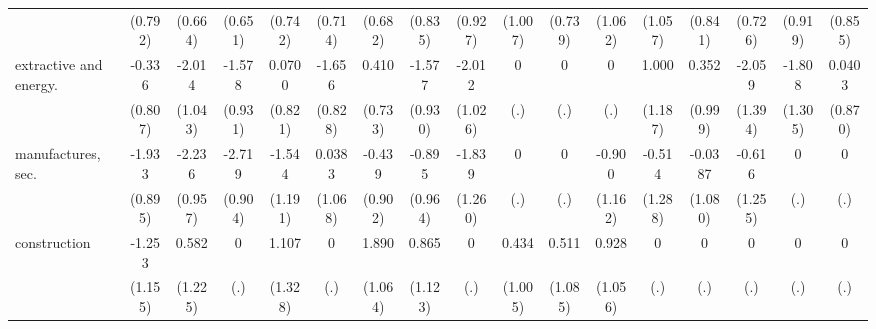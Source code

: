 {\begin{tabular}{l*{16}{c}}
                    &     (0.792)         &     (0.664)         &     (0.651)         &     (0.742)         &     (0.714)         &     (0.682)         &     (0.835)         &     (0.927)         &     (1.007)         &     (0.739)         &     (1.062)         &     (1.057)         &     (0.841)         &     (0.726)         &     (0.919)         &     (0.855)         \\
[1em]
extractive and energy.&      -0.336         &      -2.014         &      -1.578         &      0.0700         &      -1.656\sym{*}  &       0.410         &      -1.577         &      -2.012\sym{*}  &           0         &           0         &           0         &       1.000         &       0.352         &      -2.059         &      -1.808         &      0.0403         \\
                    &     (0.807)         &     (1.043)         &     (0.931)         &     (0.821)         &     (0.828)         &     (0.733)         &     (0.930)         &     (1.026)         &         (.)         &         (.)         &         (.)         &     (1.187)         &     (0.999)         &     (1.394)         &     (1.305)         &     (0.870)         \\
[1em]
manufactures, sec.  &      -1.933\sym{*}  &      -2.236\sym{*}  &      -2.719\sym{**} &      -1.544         &      0.0383         &      -0.439         &      -0.895         &      -1.839         &           0         &           0         &      -0.900         &      -0.514         &     -0.0387         &      -0.616         &           0         &           0         \\
                    &     (0.895)         &     (0.957)         &     (0.904)         &     (1.191)         &     (1.068)         &     (0.902)         &     (0.964)         &     (1.260)         &         (.)         &         (.)         &     (1.162)         &     (1.288)         &     (1.080)         &     (1.255)         &         (.)         &         (.)         \\
[1em]
construction        &      -1.253         &       0.582         &           0         &       1.107         &           0         &       1.890         &       0.865         &           0         &       0.434         &       0.511         &       0.928         &           0         &           0         &           0         &           0         &           0         \\
                    &     (1.155)         &     (1.225)         &         (.)         &     (1.328)         &         (.)         &     (1.064)         &     (1.123)         &         (.)         &     (1.005)         &     (1.085)         &     (1.056)         &         (.)         &         (.)         &         (.)         &         (.)         &         (.)         \\

\end{tabular}}
